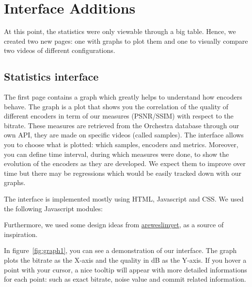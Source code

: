 \documentclass[a4paper,12pt]{article}
\begin{document}
\section{Interface Additions}
At this point, the statistics were only viewable through a big table.  Hence, we
created two new pages: one with graphs to plot them and one to visually compare
two videos of different configurations.

\subsection{Statistics interface}
The first page contains a graph which greatly helps to understand how encoders
behave.  The graph is a plot that shows you the correlation of the quality of
different encoders in term of our measures (PSNR/SSIM) with respect to the
bitrate.  These measures are retrieved from the Orchestra database through our
own API, they are made on specific videos (called samples).  The interface
allows you to choose what is plotted: which samples, encoders and metrics.
Moreover, you can define time interval, during which measures were done, to show
the evolution of the encoders as they are developed.  We expect them to improve
over time but there may be regressions which would be easily tracked down with
our graphs.

The interface is implemented mostly using HTML, Javascript and CSS.  We used
the following Javascript modules:
Furthermore, we used some design ideas from
\href{http://areweslimyet.com}{areweslimyet}, as a source of inspiration.

In figure~\ref{fig:graph1}, you can see a demonstration of our interface.  The
graph plots the bitrate as the X-axis and the quality in dB as the Y-axis.  If you
hover a point with your cursor, a nice tooltip will appear with more detailed
informations for each point: such as exact bitrate, noise value and commit
related information.
\end{document}
